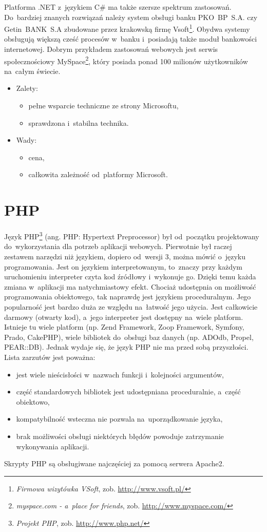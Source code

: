\documentclass[a4paper,12pt,oneside]{report}
\begin{document}
Platforma .NET z~językiem C\#  ma także szersze spektrum zastosowań. Do~bardziej znanych rozwiązań należy system obsługi banku PKO~BP~S.A. czy Getin~BANK~S.A zbudowane przez krakowską firmę Vsoft\footnote{\emph{Firmowa wizytówka VSoft}, zob. \url{http://www.vsoft.pl/}}. Obydwa systemy obsługują większą cześć procesów w~banku i~posiadają także moduł bankowości internetowej. Dobrym przykładem zastosowań webowych jest serwis społecznościowy MySpace\footnote{\emph{myspace.com - a~place for friends}, zob. \url{http://www.myspace.com/}}, który posiada ponad 100 milionów użytkowników na~całym świecie.
\begin{itemize}
\item Zalety:
  \begin{itemize}
  \item pełne wsparcie techniczne ze strony Microsoftu,
  \item sprawdzona i~stabilna technika.
  \end{itemize}
\item Wady:
  \begin{itemize}
  \item cena,
  \item całkowita zależność od~platformy Microsoft.
  \end{itemize}
\end{itemize}

\section{PHP}
\label{sec:php}
Język PHP\footnote{\emph{Projekt PHP}, zob. \url{http://www.php.net/}} (ang. PHP: Hypertext Preprocessor) był od~początku projektowany do~wykorzystania dla potrzeb aplikacji webowych. Pierwotnie był raczej zestawem narzędzi niż językiem, dopiero od~wersji 3, można mówić o~języku programowania. Jest on językiem interpretowanym, to~znaczy przy każdym uruchomieniu interpreter czyta kod źródłowy i~wykonuje go. Dzięki temu każda zmiana w~aplikacji ma natychmiastowy efekt. Chociaż udostępnia on możliwość programowania obiektowego, tak naprawdę jest językiem proceduralnym. Jego popularność jest bardzo duża ze względu na~łatwość jego użycia. Jest całkowicie darmowy (otwarty kod), a~jego interpreter jest dostępny na~wiele platform. Istnieje tu wiele platform (np. Zend Framework, Zoop Framework, Symfony, Prado, CakePHP), wiele bibliotek do~obsługi baz danych (np. ADOdb, Propel, PEAR::DB). Jednak wydaje się, że język PHP nie ma przed sobą przyszłości. Lista zarzutów jest poważna:
\begin{itemize}
  \item jest wiele nieścisłości w~nazwach funkcji i~kolejności argumentów,
  \item część standardowych bibliotek jest udostępniana proceduralnie, a~część obiektowo,
  \item kompatybilność wsteczna nie pozwala na~uporządkowanie języka,
  \item brak możliwości obsługi niektórych błędów powoduje zatrzymanie wykonywania aplikacji.
\end{itemize}
Skrypty PHP są obsługiwane najczęściej za pomocą serwera Apache2.
\end{document}
